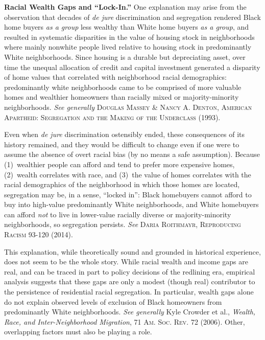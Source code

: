 \begin{questions}
\item \textbf{Racial Wealth Gaps and ``Lock-In.''} One explanation may arise
from the observation that decades of \textit{de jure} discrimination and
segregation rendered Black home buyers \textit{as a group} less wealthy than
White home buyers \textit{as a group}, and resulted in systematic disparities
in the value of housing stock in neighborhoods where mainly nonwhite people
lived relative to housing stock in predominantly White neighborhoods. Since
housing is a durable but depreciating asset, over time the unequal allocation
of credit and capital investment generated a disparity of home values that
correlated with neighborhood racial demographics: predominantly white
neighborhoods came to be comprised of more valuable homes and wealthier
homeowners than racially mixed or majority-minority neighborhoods. \textit{See
generally} \textsc{Douglas Massey \& Nancy A. Denton, American Apartheid:
Segregation and the Making of the Underclass} (1993).

Even when \textit{de jure} discrimination ostensibly ended, these consequences
of its history remained, and they would be difficult to change even if one were
to assume the absence of overt racial bias (by no means a safe assumption).
Because (1)~wealthier people can afford and tend to prefer more expensive
homes, (2)~wealth correlates with race, and (3)~the value of homes correlates
with the racial demographics of the neighborhood in which those homes are
located, segregation may be, in a sense, ``locked in'': Black homebuyers cannot
afford to buy into high-value predominantly White neighborhoods, and White
homebuyers can afford \textit{not} to live in lower-value racially diverse or
majority-minority neighborhoods, so segregation persists. \textit{See}
\textsc{Daria Roithmayr, Reproducing Racism} 93-120 (2014).

This explanation, while theoretically sound and grounded in historical
experience, does not seem to be the whole story. While racial wealth and income
gaps are real, and can be traced in part to policy decisions of the redlining
era, empirical analysis suggests that these gaps are only a modest (though
real) contributor to the persistence of residential racial segregation. In
particular, wealth gaps alone do not explain observed levels of exclusion of
Black homeowners from predominantly White neighborhoods. \textit{See generally}
Kyle Crowder et al., \textit{Wealth, Race, and Inter-Neighborhood Migration},
71 \textsc{Am. Soc. Rev.} 72 (2006). Other, overlapping factors must also be
playing a role. 



\end{questions}
